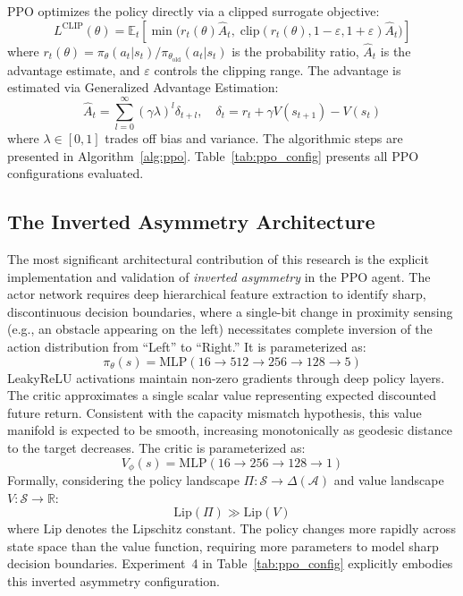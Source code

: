 \documentclass{article}
\begin{document}
PPO optimizes the policy directly via a clipped surrogate objective:
\begin{equation}
    L^\text{CLIP}(\theta) = \mathbb{E}_t\!\left[\min\bigl(r_t(\theta)
    \hat{A}_t,\;\text{clip}(r_t(\theta),1{-}\varepsilon,1{+}\varepsilon)
    \hat{A}_t\bigr)\right]
\end{equation}
where $r_t(\theta) = \pi_\theta(a_t|s_t)/\pi_{\theta_\text{old}}(a_t|s_t)$
is the probability ratio, $\hat{A}_t$ is the advantage estimate, and
$\varepsilon$ controls the clipping range. The advantage is estimated via
Generalized Advantage Estimation:
\begin{equation}
    \hat{A}_t = \sum_{l=0}^{\infty}(\gamma\lambda)^l \delta_{t+l},\quad
    \delta_t = r_t + \gamma V(s_{t+1}) - V(s_t)
\end{equation}
where $\lambda \in [0,1]$ trades off bias and variance. The algorithmic steps
are presented in Algorithm~\ref{alg:ppo}. Table~\ref{tab:ppo_config} presents
all PPO configurations evaluated.

\subsection{The Inverted Asymmetry Architecture}

The most significant architectural contribution of this research is the explicit
implementation and validation of \emph{inverted asymmetry} in the PPO agent.
The actor network requires deep hierarchical feature extraction to identify
sharp, discontinuous decision boundaries, where a single-bit change in proximity
sensing (e.g., an obstacle appearing on the left) necessitates complete inversion
of the action distribution from ``Left'' to ``Right.'' It is parameterized as:
\begin{equation}
    \pi_\theta(s) = \mathrm{MLP}(16 \to 512 \to 256 \to 128 \to 5)
\end{equation}
LeakyReLU activations maintain non-zero gradients through deep policy layers.
The critic approximates a single scalar value representing expected discounted
future return. Consistent with the capacity mismatch hypothesis, this value
manifold is expected to be smooth, increasing monotonically as geodesic distance
to the target decreases. The critic is parameterized as:
\begin{equation}
    V_\phi(s) = \mathrm{MLP}(16 \to 256 \to 128 \to 1)
\end{equation}
Formally, considering the policy landscape $\Pi : \mathcal{S} \to
\Delta(\mathcal{A})$ and value landscape $V : \mathcal{S} \to \mathbb{R}$:
\begin{equation}
    \mathrm{Lip}(\Pi) \gg \mathrm{Lip}(V)
\end{equation}
where $\mathrm{Lip}$ denotes the Lipschitz constant. The policy changes more
rapidly across state space than the value function, requiring more parameters
to model sharp decision boundaries. Experiment~4 in Table~\ref{tab:ppo_config}
explicitly embodies this inverted asymmetry configuration.
\end{document}
